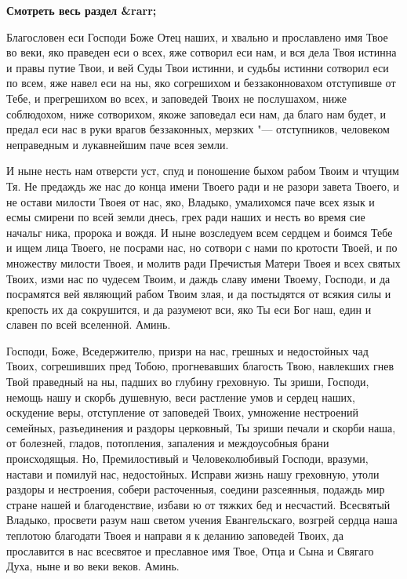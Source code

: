 




\bfseries Смотреть весь раздел &rarr;\normalfont{} 




Благословен еси Господи Боже Отец наших, и хвально и прославлено имя Твое во веки, яко праведен еси о всех, яже сотворил еси нам, и вся дела Твоя истинна и правы путие Твои, и вей Суды Твои истинни, и судьбы истинни сотворил еси по всем, яже навел еси на ны, яко согрешихом и беззаконновахом отступивше от Тебе, и прегрешихом во всех, и заповедей Твоих не послушахом, ниже соблюдохом, ниже сотворихом, якоже заповедал еси нам, да благо нам будет, и предал еси нас в руки врагов беззаконных, мерзких "--- отступников, человеком неправедным и лукавнейшим паче всея земли. 

И ныне несть нам отверсти уст, спуд и поношение быхом рабом Твоим и чтущим Тя. Не предаждь же нас до конца имени Твоего ради и не разори завета Твоего, и не остави милости Твоея от нас, яко, Владыко, умалихомся паче всех язык и есмы смирени по всей земли днесь, грех ради наших и несть во время сие начальг ника, пророка и вождя. И ныне возследуем всем сердцем и боимся Тебе и ищем лица Твоего, не посрами нас, но сотвори с нами по кротости Твоей, и по множеству милости Твоея, и молитв ради Пречистыя Матери Твоея и всех святых Твоих, изми нас по чудесем Твоим, и даждь славу имени Твоему, Господи, и да посрамятся вей являющий рабом Твоим злая, и да постыдятся от всякия силы и крепость их да сокрушится, и да разумеют вси, яко Ты еси Бог наш, един и славен по всей вселенной. Аминь. 





\mychapterending




Господи, Боже, Вседержителю, призри на нас, грешных и недостойных чад Твоих, согрешивших пред Тобою, прогневавших благость Твою, навлекших гнев Твой праведный на ны, падших во глубину греховную. Ты зриши, Господи, немощь нашу и скорбь душевную, веси растление умов и сердец наших, оскудение веры, отступление от заповедей Твоих, умножение нестроений семейных, разъединения и раздоры церковный, Ты зриши печали и скорби наша, от болезней, гладов, потопления, запаления и междоусобныя брани происходящыя. Но, Премилостивый и Человеколюбивый Господи, вразуми, настави и помилуй нас, недостойных. Исправи жизнь нашу греховную, утоли раздоры и нестроения, собери расточенныя, соедини разсеянныя, подаждь мир стране нашей и благоденствие, избави ю от тяжких бед и несчастий. Всесвятый Владыко, просвети разум наш светом учения Евангельскаго, возгрей сердца наша теплотою благодати Твоея и направи я к деланию заповедей Твоих, да прославится в нас всесвятое и преславное имя Твое, Отца и Сына и Свягаго Духа, ныне и во веки веков. Аминь. 






